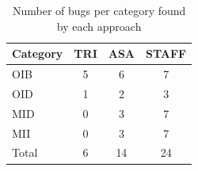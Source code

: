 \begin{table}[ht]
\centering
\renewcommand{\arraystretch}{1.1}
\begin{tabular}{|l||c|c|c|}
\hline
{\sc Category} & {\sc TRI} & {\sc ASA} & {\sc STAFF} \\
\hline\hline
OIB & 5 & 6 & 7 \\
OID & 1 & 2 & 3 \\
MID & 0 & 3 & 7 \\
MII & 0 & 3 & 7 \\
\hline
Total & 6 & 14 & 24 \\
\hline
\end{tabular}
\caption{Number of bugs per category found by each approach}
\label{tab:bugs_per_category_by_approach}
\end{table}
